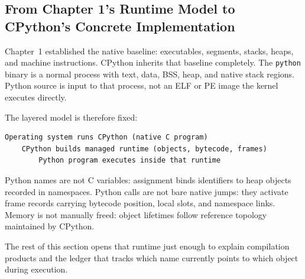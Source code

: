 \subsection{From Chapter 1's Runtime Model to CPython's Concrete Implementation}

Chapter~1 established the native baseline: executables, segments, stacks, heaps, and machine instructions. CPython inherits that baseline completely. The \texttt{python} binary is a normal process with text, data, BSS, heap, and native stack regions. Python source is input to that process, not an ELF or PE image the kernel executes directly.

The layered model is therefore fixed:

\begin{verbatim}
Operating system runs CPython (native C program)
    CPython builds managed runtime (objects, bytecode, frames)
        Python program executes inside that runtime
\end{verbatim}

Python names are not C variables: assignment binds identifiers to heap objects recorded in namespaces. Python calls are not bare native jumps: they activate frame records carrying bytecode position, local slots, and namespace links. Memory is not manually freed: object lifetimes follow reference topology maintained by CPython.

The rest of this section opens that runtime just enough to explain compilation products and the ledger that tracks which name currently points to which object during execution.
